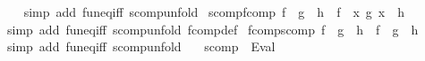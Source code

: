 \begin{isabellebody}
%
\isadelimproof
\ \ %
\endisadelimproof
%
\isatagproof
{}\isamarkupfalse%
\ {\isacharparenleft}{\kern0pt}simp\ add{\isacharcolon}{\kern0pt}\ fun{\isacharunderscore}{\kern0pt}eq{\isacharunderscore}{\kern0pt}iff\ scomp{\isacharunderscore}{\kern0pt}unfold{\isacharparenright}{\kern0pt}%
\endisatagproof
{\isafoldproof}%
%
\isadelimproof
\isanewline
%
\endisadelimproof
\isanewline
{}\isamarkupfalse%
\ scomp{\isacharunderscore}{\kern0pt}fcomp{\isacharcolon}{\kern0pt}\ {\isachardoublequoteopen}{\isacharparenleft}{\kern0pt}f\ {\isasymcirc}{\isasymrightarrow}\ g{\isacharparenright}{\kern0pt}\ {\isasymcirc}{\isachargreater}{\kern0pt}\ h\ {\isacharequal}{\kern0pt}\ f\ {\isasymcirc}{\isasymrightarrow}\ {\isacharparenleft}{\kern0pt}{\isasymlambda}x{\isachardot}{\kern0pt}\ g\ x\ {\isasymcirc}{\isachargreater}{\kern0pt}\ h{\isacharparenright}{\kern0pt}{\isachardoublequoteclose}\isanewline
%
\isadelimproof
\ \ %
\endisadelimproof
%
\isatagproof
{}\isamarkupfalse%
\ {\isacharparenleft}{\kern0pt}simp\ add{\isacharcolon}{\kern0pt}\ fun{\isacharunderscore}{\kern0pt}eq{\isacharunderscore}{\kern0pt}iff\ scomp{\isacharunderscore}{\kern0pt}unfold\ fcomp{\isacharunderscore}{\kern0pt}def{\isacharparenright}{\kern0pt}%
\endisatagproof
{\isafoldproof}%
%
\isadelimproof
\isanewline
%
\endisadelimproof
\isanewline
{}\isamarkupfalse%
\ fcomp{\isacharunderscore}{\kern0pt}scomp{\isacharcolon}{\kern0pt}\ {\isachardoublequoteopen}{\isacharparenleft}{\kern0pt}f\ {\isasymcirc}{\isachargreater}{\kern0pt}\ g{\isacharparenright}{\kern0pt}\ {\isasymcirc}{\isasymrightarrow}\ h\ {\isacharequal}{\kern0pt}\ f\ {\isasymcirc}{\isachargreater}{\kern0pt}\ {\isacharparenleft}{\kern0pt}g\ {\isasymcirc}{\isasymrightarrow}\ h{\isacharparenright}{\kern0pt}{\isachardoublequoteclose}\isanewline
%
\isadelimproof
\ \ %
\endisadelimproof
%
\isatagproof
{}\isamarkupfalse%
\ {\isacharparenleft}{\kern0pt}simp\ add{\isacharcolon}{\kern0pt}\ fun{\isacharunderscore}{\kern0pt}eq{\isacharunderscore}{\kern0pt}iff\ scomp{\isacharunderscore}{\kern0pt}unfold{\isacharparenright}{\kern0pt}%
\endisatagproof
{\isafoldproof}%
%
\isadelimproof
\isanewline
%
\endisadelimproof
\isanewline
{}\isamarkupfalse%
\isanewline
\isanewline
{}\isamarkupfalse%
\isanewline
\ \ \ scomp\ {\isasymrightharpoonup}\ {\isacharparenleft}{\kern0pt}Eval{\isacharparenright}{\kern0pt}\ \ {}\ {\isachardoublequoteopen}{\isacharhash}{\kern0pt}{\isacharminus}{\kern0pt}{\isachargreater}{\kern0pt}{\isachardoublequoteclose}%

\end{isabellebody}
